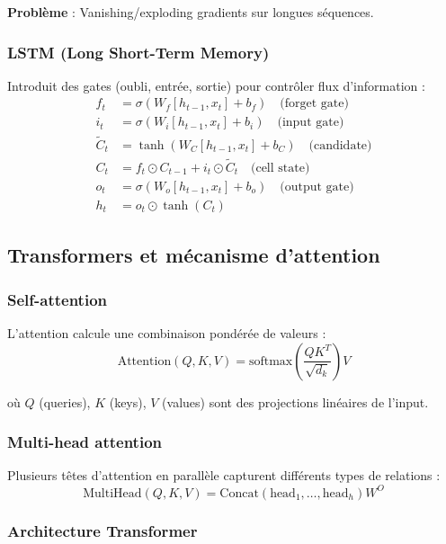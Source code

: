\textbf{Problème} : Vanishing/exploding gradients sur longues séquences.

\subsubsection{LSTM (Long Short-Term Memory)}

Introduit des gates (oubli, entrée, sortie) pour contrôler flux d'information :
\begin{align*}
f_t &= \sigma(W_f [h_{t-1}, x_t] + b_f) \quad \text{(forget gate)} \\
i_t &= \sigma(W_i [h_{t-1}, x_t] + b_i) \quad \text{(input gate)} \\
\tilde{C}_t &= \tanh(W_C [h_{t-1}, x_t] + b_C) \quad \text{(candidate)} \\
C_t &= f_t \odot C_{t-1} + i_t \odot \tilde{C}_t \quad \text{(cell state)} \\
o_t &= \sigma(W_o [h_{t-1}, x_t] + b_o) \quad \text{(output gate)} \\
h_t &= o_t \odot \tanh(C_t)
\end{align*}

\subsection{Transformers et mécanisme d'attention}

\subsubsection{Self-attention}

L'attention calcule une combinaison pondérée de valeurs :
\[
\text{Attention}(Q, K, V) = \text{softmax}\left(\frac{QK^T}{\sqrt{d_k}}\right) V
\]

où $Q$ (queries), $K$ (keys), $V$ (values) sont des projections linéaires de l'input.

\subsubsection{Multi-head attention}

Plusieurs têtes d'attention en parallèle capturent différents types de relations :
\[
\text{MultiHead}(Q, K, V) = \text{Concat}(\text{head}_1, \ldots, \text{head}_h) W^O
\]

\subsubsection{Architecture Transformer}

